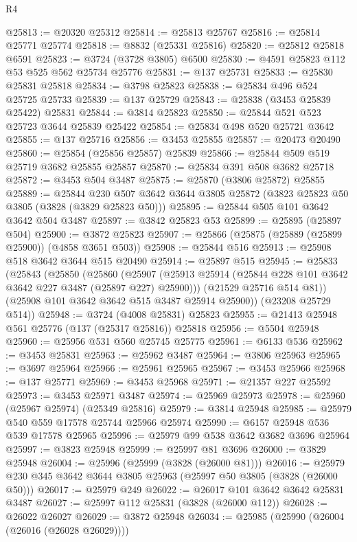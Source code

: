 \begin{lexlean}{R4}
\begin{coremodule}
@25813 := @20320 @25312
@25814 := @25813 @25767
@25816 := @25814 @25771 @25774
@25818 := @8832 (@25331 @25816)
@25820 := @25812 @25818 @6591
@25823 := @3724 (@3728 @3805) @6500
@25830 := @4591 @25823 @112 @53 @525 @562 @25734 @25776
@25831 := @137 @25731
@25833 := @25830 @25831 @25818
@25834 := @3798 @25823
@25838 := @25834 @496 @524 @25725 @25733
@25839 := @137 @25729
@25843 := @25838 (@3453 @25839 @25422) @25831
@25844 := @3814 @25823
@25850 := @25844 @521 @523 @25723 @3644 @25839 @25422
@25854 := @25834 @498 @520 @25721 @3642
@25855 := @137 @25716
@25856 := @3453 @25855
@25857 := @20473 @20490
@25860 := @25854 (@25856 @25857) @25839
@25866 := @25844 @509 @519 @25719 @3682 @25855 @25857
@25870 := @25834 @391 @508 @3682 @25718
@25872 := @3453 @504 @3487
@25875 := @25870 (@3806 @25872) @25855
@25889 := @25844
    @230
    @507
    @3642
    @3644
    @3805
    @25872
    (@3823 @25823 @50 @3805 (@3828 (@3829 @25823 @50)))
@25895 := @25844 @505 @101 @3642 @3642 @504 @3487
@25897 := @3842 @25823 @53
@25899 := @25895 (@25897 @504)
@25900 := @3872 @25823
@25907 := @25866 (@25875 (@25889 (@25899 @25900)) (@4858 @3651 @503))
@25908 := @25844 @516
@25913 := @25908 @518 @3642 @3644 @515 @20490
@25914 := @25897 @515
@25945 := @25833
    (@25843
      (@25850
        (@25860
          (@25907 (@25913 @25914 (@25844 @228 @101 @3642 @3642 @227 @3487 (@25897 @227) @25900)))
          (@21529 @25716 @514 @81))
        (@25908 @101 @3642 @3642 @515 @3487 @25914 @25900))
      (@23208 @25729 @514))
@25948 := @3724 (@4008 @25831) @25823
@25955 := @21413 @25948 @561 @25776 (@137 (@25317 @25816)) @25818
@25956 := @5504 @25948
@25960 := @25956 @531 @560 @25745 @25775
@25961 := @6133 @536
@25962 := @3453 @25831
@25963 := @25962 @3487
@25964 := @3806 @25963
@25965 := @3697 @25964
@25966 := @25961 @25965
@25967 := @3453 @25966
@25968 := @137 @25771
@25969 := @3453 @25968
@25971 := @21357 @227 @25592
@25973 := @3453 @25971 @3487
@25974 := @25969 @25973
@25978 := @25960 (@25967 @25974) (@25349 @25816)
@25979 := @3814 @25948
@25985 := @25979 @540 @559 @17578 @25744 @25966 @25974
@25990 := @6157 @25948 @536 @539 @17578 @25965
@25996 := @25979 @99 @538 @3642 @3682 @3696 @25964
@25997 := @3823 @25948
@25999 := @25997 @81 @3696
@26000 := @3829 @25948
@26004 := @25996 (@25999 (@3828 (@26000 @81)))
@26016 := @25979 @230 @345 @3642 @3644 @3805 @25963 (@25997 @50 @3805 (@3828 (@26000 @50)))
@26017 := @25979 @249
@26022 := @26017 @101 @3642 @3642 @25831 @3487
@26027 := @25997 @112 @25831 (@3828 (@26000 @112))
@26028 := @26022 @26027
@26029 := @3872 @25948
@26034 := @25985 (@25990 (@26004 (@26016 (@26028 @26029))))

\end{coremodule}
\end{lexlean}

